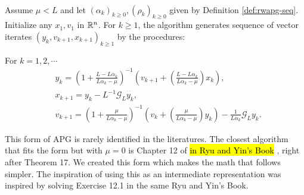 \documentclass[12pt]{article}
\begin{document}
        \begin{definition}\label{def:r-wapg-intermediate}\;\\
            Assume $\mu < L$ and let $(\alpha_k)_{k \ge 0}, (\rho_k)_{k \ge 0}$ given by Definition \ref{def:rwapg-seq}. 
            Initialize any $x_1, v_1$ in $\mathbb R^n$. 
            For $k \ge 1$, the algorithm generates sequence of vector iterates $(y_{k}, v_{k + 1}, x_{k + 1})_{k \ge 1}$ by the procedures: 
            \begin{tcolorbox}
                For $k = 1, 2, \cdots$
                \begin{align*} 
                    & y_{k} = 
                    \left(
                        1 + \frac{L - L\alpha_{k}}{L\alpha_{k} - \mu}
                    \right)^{-1}
                    \left(
                        v_{k + 1} + 
                        \left(\frac{L - L\alpha_{k}}{L\alpha_{k} - \mu} \right) x_{k}
                    \right), 
                    \\
                    & x_{k + 1} = 
                    y_k - L^{-1} \mathcal G_L y_k, 
                    \\
                    & v_{k + 1} = 
                    \left(
                        1 + \frac{\mu}{L \alpha_k - \mu}
                    \right)^{-1}
                    \left(
                        v_k + 
                        \left(\frac{\mu}{L \alpha_k - \mu}\right) y_k
                    \right) - \frac{1}{L\alpha_{k}}\mathcal G_L y_k. 
                \end{align*}
            \end{tcolorbox}
        \end{definition}
        \begin{remark}
            This form of APG is rarely identified in the literatures. 
            The closest algorithm that fits the form but with $\mu = 0$ is Chapter 12 of 
            {\hl{in Ryu and Yin's Book} \cite{ryu_large-scale_2022}}, 
            right after Theorem 17. 
            We created this form which makes the math that follows simpler. 
            The inspiration of using this as an intermediate representation was inspired by solving Exercise 12.1 in the same Ryu and Yin's Book. 
        \end{remark}
\end{document}
